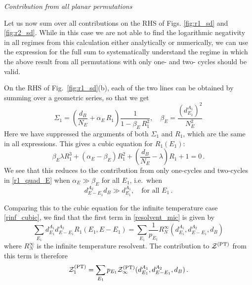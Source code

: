 \documentclass[a4paper,11pt]{article}
\newcommand{\be}{\begin{equation}}
\newcommand{\ee}{\end{equation}}
\newcommand\sZ{{\mathcal Z}}
\begin{document}
\begin{enumerate}
\begin{appendix}
\noindent \textit{Contribution from all planar permutations}

Let us now sum over all contributions on the RHS of Figs. \ref{fig:r1_sd} and \ref{fig:r2_sd}. While in this case we are not able to find the logarithmic negativity in all regimes from this calculation either analytically or numerically, we can use the expression for the full sum to systematically understand the regime in which the above result from all permutations with only one- and two- cycles should be valid.

On the RHS of Fig.~\ref{fig:r1_sd}(b), each of the two lines can be obtained by summing over a geometric series, so that we get 
\be
\Sigma_1 = \left(\frac{d_B}{N_E} + \alpha_E \, R_1\right) \frac{1}{1-\beta_E\, R_1^2} , \quad \beta_E = \frac{(d^{A_1}_{E_1})^2}{N_E^2}
\ee
Here we have suppressed the arguments of both $\Sigma_1$ and $R_1$, which are the same in all expressions. This gives a cubic equation for $R_1(E_1)$: 
\be 
\beta_E \lambda R_1^3 + (\alpha_E-\beta_E) R_1^2 + \left(\frac{d_B}{N_E}-\lambda\right) R_1+ 1= 0 \, . 
\ee
We see that this reduces to the contribution from only one-cycles and two-cycles in \eqref{r1_quad_E} when $\alpha_E \gg \beta_E$ for all $E_1$, i.e.~when
\be 
 d^{A_2}_{E-E_1} d_B \gg d^{A_1}_{E_1}, \quad \text{for all $E_1$} \, . \label{first_c}
\ee

Comparing this to the cubic equation for the infinite temperature case \eqref{rinf_cubic}, we find that the first term in \eqref{resolvent_mic} is given by 
\be 
 \sum_{E_1} d^{A_1}_{E_1} d^{A_2}_{E- E_1} R_1(E_1, E- E_1) = \sum_{E_1} \frac{1}{p_{E_1}} R_N^{\infty}(d^{A_1}_{E_1},d^{A_2}_{E-E_1}, d_B) 
\ee
where $R_N^{\infty}$ is the infinite temperature resolvent. The contribution to $\sZ^{\rm (PT)}$ from this term is therefore 
\be 
\sZ^{\rm (PT)}_1 = \sum_{E_1} p_{E_1} \sZ^{\rm (PT)}_{\infty}(d^{A_1}_{E_1}, d^{A_2}_{E-E_1}, d_B)\, . 
\ee


\end{appendix}
\end{enumerate}
\end{document}
